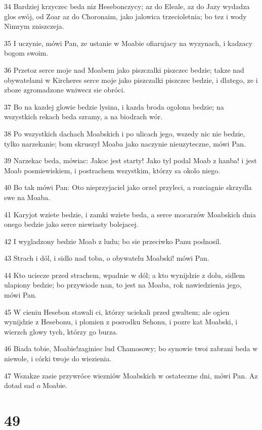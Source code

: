 \par 34 Bardziej krzyczec beda niz Hesebonczycy; az do Eleale, az do Jazy wydadza glos swój, od Zoar az do Choronaim, jako jalowica trzecioletnia; bo tez i wody Nimrym zniszczeja.
\par 35 I uczynie, mówi Pan, ze ustanie w Moabie ofiarujacy na wyzynach, i kadzacy bogom swoim.
\par 36 Przetoz serce moje nad Moabem jako piszczalki piszczec bedzie; takze nad obywatelami w Kircheres serce moje jako piszczalki piszczec bedzie, i dlatego, ze i zboze zgromadzone wniwecz sie obróci.
\par 37 Bo na kazdej glowie bedzie lysina, i kazda broda ogolona bedzie; na wszystkich rekach beda szramy, a na biodrach wór.
\par 38 Po wszystkich dachach Moabskich i po ulicach jego, wszedy nic nie bedzie, tylko narzekanie; bom skruszyl Moaba jako naczynie nieuzyteczne, mówi Pan.
\par 39 Narzekac beda, mówiac: Jakoc jest starty! Jako tyl podal Moab z hanba! i jest Moab posmiewiskiem, i postrachem wszystkim, którzy sa okolo niego.
\par 40 Bo tak mówi Pan: Oto nieprzyjaciel jako orzel przyleci, a rozciagnie skrzydla swe na Moaba.
\par 41 Karyjot wziete bedzie, i zamki wziete beda, a serce mocarzów Moabskich dnia onego bedzie jako serce niewiasty bolejacej.
\par 42 I wygladzony bedzie Moab z ludu; bo sie przeciwko Panu podnosil.
\par 43 Strach i dól, i sidlo nad toba, o obywatelu Moabski! mówi Pan.
\par 44 Kto uciecze przed strachem, wpadnie w dól; a kto wynijdzie z dolu, sidlem ulapiony bedzie; bo przywiode nan, to jest na Moaba, rok nawiedzienia jego, mówi Pan.
\par 45 W cieniu Hesebon stawali ci, którzy uciekali przed gwaltem; ale ogien wynijdzie z Hesebonu, i plomien z posrodku Sehonu, i pozre kat Moabski, i wierzch glowy tych, którzy go burza.
\par 46 Biada tobie, Moabie!zaginiec lud Chamosowy; bo synowie twoi zabrani beda w niewole, i córki twoje do wiezienia.
\par 47 Wszakze zasie przywróce wiezniów Moabskich w ostateczne dni, mówi Pan. Az dotad sad o Moabie.

\chapter{49}


